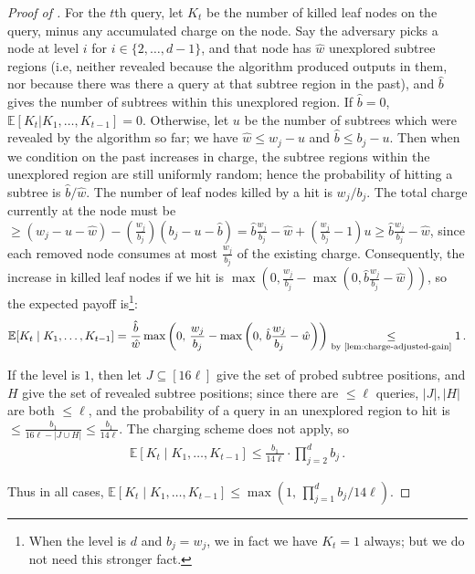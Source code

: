 \documentclass[10pt,a4paper]{article}
\theoremstyle{definition}
\theoremstyle{remark}
\newcommand{\EE}{\mathbb{E}}
\newcommand{\hw}{\hat{w}}
\newcommand{\hb}{\hat{b}}
\newcommand{\rl}{\mathbf{\ell}}             %
\begin{document}
\begin{itemize}
\begin{itemize}
\begin{proof}[Proof of ]
  For the $t$th query, let $K_t$ be the number of killed leaf nodes on the query,
  minus any accumulated charge on the node. Say the adversary picks a node at level $i$ for $i \in \{2,\ldots,d-1\}$, and that
  node has $\hw$ unexplored subtree regions (i.e, neither revealed because
  the algorithm produced outputs in them, nor because there was there a query at that subtree region
  in the past), and $\hb$ gives the number of subtrees within this unexplored
  region. If $\hb = 0$, $\EE[K_t | K_1,\ldots,K_{t-1}] = 0$. Otherwise, let $u$ be the number of subtrees which were revealed by the algorithm so far; we have $\hw \le w_j - u$ and $\hb \le b_j - u$. Then when we condition on the past increases in charge, the subtree regions within the unexplored region are still uniformly random; hence
  the probability of hitting a subtree is $\hb / \hw$. The number of leaf nodes
  killed by a hit is $w_j / b_j$.  The total charge currently at the node must be
  $\ge (w_j - u - \hw) - (\frac{w_j}{b_j}) (b_j - u - \hb) = \hb \frac{w_j}{b_j} - \hw + (\frac{w_j}{b_j} - 1) u \ge \hb \frac{w_j}{b_j} - \hw$, since each removed node consumes at most $\frac{w_j}{b_j}$ of the existing charge.
  Consequently, the increase in killed leaf nodes if we hit is $\max(0, \frac{w_j}{b_j} - \max(0, \hb \frac{w_j}{b_j} - \hw))$, so the expected payoff is\footnote{When the level is $d$ and $b_j=w_j$, we in fact we have $K_t = 1$ always; but we do not need this stronger fact.}:
  \begin{align*}
    \EE[K_t \mid K_1,\ldots,K_{t-1}] = \frac{\hb}{\hw} \max\left(0,\, \frac{w_j}{b_j} - \max\left(0,\, \hb \frac{w_j}{b_j} - \hw\right)\right) \underset{\text{by \Cref{lem:charge-adjusted-gain}}}{\le} 1 \,.
  \end{align*}
  
  If the level is $1$, then let $J \subseteq [16 \rl]$ give the set of probed subtree positions,
  and $H$ give the set of revealed subtree positions; since there are $\le \rl$ queries,
  $|J|,|H|$ are both $\le \rl$, and the probability of a query in an unexplored
  region to hit is $\le \frac{b_1}{16 \rl - |J \cup H|} \le \frac{b_1}{14 \rl}$. The charging scheme does not apply, so
  \begin{align*}
    \EE[K_t \mid K_1,\ldots,K_{t-1}] \le \frac{b_1}{14 \rl} \cdot \prod_{j=2}^{d} b_j \,.
  \end{align*}
  
  Thus in all cases, $\EE[K_t \mid K_1,\ldots,K_{t-1}] \le \max(1,\, \prod_{j=1}^{d} b_j / 14 \rl)$. 
  

\end{proof}
\end{itemize}
\end{itemize}
\end{document}
